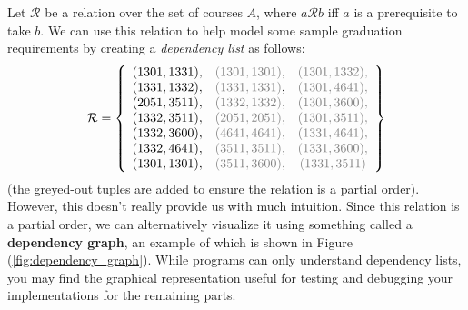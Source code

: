 \documentclass{article}
\newcommand{\gray}[1]{\textcolor{gray}{#1}}
\begin{document}
    Let $\mathcal{R}$ be a relation over the set of courses $A$, where $a \mathcal{R} b$ iff $a$ is a prerequisite to take $b$. We can use this relation to help model some sample graduation requirements by creating a \textit{dependency list} as follows:
    $$\mathcal{R} = 
    \left\{
    \begin{array}{ccc}
        (1301, 1331), & \gray{(1301, 1301)}, & \gray{(1301, 1332),} \\
        (1331, 1332), & \gray{(1331, 1331)}, & \gray{(1301, 4641),} \\
        (2051, 3511),& \gray{(1332, 1332),} & \gray{(1301, 3600),} \\
        (1332, 3511), & \gray{(2051, 2051),} & \gray{(1301, 3511),} \\
        (1332, 3600), & \gray{(4641, 4641),} & \gray{(1331, 4641),} \\
        (1332, 4641), & \gray{(3511, 3511),} & \gray{(1331, 3600),} \\
        (1301, 1301), & \gray{(3511, 3600),} & \gray{(1331, 3511)} \\
    \end{array}
    \right\}$$
    (the greyed-out tuples are added to ensure the relation is a partial order). However, this doesn't really provide us with much intuition. Since this relation is a partial order, we can alternatively visualize it using something called a \textbf{dependency graph}, an example of which is shown in Figure (\ref{fig:dependency_graph}). While programs can only understand dependency lists, you may find the graphical representation useful for testing and debugging your implementations for the remaining parts.
    
\end{document}
